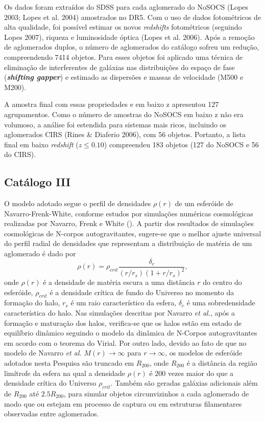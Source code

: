 Os dados foram extraídos do SDSS para cada aglomerado do NoSOCS (Lopes 2003; Lopes et al. 2004) amostrados no DR5. Com o uso de dados fotométricos de alta qualidade, foi possível estimar os novos \textit{redshifts} fotométricos (seguindo Lopes 2007), riqueza e luminosidade óptica (Lopes et al. 2006). Após a remoção de aglomerados duplos, o número de aglomerados do catálogo sofreu um redução, compreendendo 7414 objetos. Para esses objetos foi aplicado uma técnica de eliminação de interferentes de galáxias nas distribuições do espaço de fase (\textit{\textbf{shifting gapper}}) e estimado as dispersões e massas de velocidade (M500 e M200). 

A amostra final com essas propriedades e em baixo z apresentou 127 agrupamentos. Como o número de amostras do NoSOCS em baixo z não era volumoso, a análise foi estendida para sistemas mais ricos, incluindo os aglomerados CIRS (Rines \& Diaferio 2006), com 56 objetos. Portanto, a lista final em baixo \textit{redshift} ($z \leq 0.10$) compreendeu 183 objetos (127 do NoSOCS e 56 do CIRS). 

\subsection{Catálogo III}
O modelo adotado segue o perfil de densidades $\rho(r)$ de um esfer\'oide de Navarro-Frenk-White, conforme estudos por simula\c c\~oes num\'ericas cosmol\'ogicas realizadas por Navarro, Frenk e White (\cite{NFW1997}). A partir dos resultados de simula\c c\~oes cosmol\'ogicas de N-corpos autogravitantes, sugere-se que o melhor ajuste universal do perfil radial de densidades que representam a distribui\c c\~ao de mat\'eria de um aglomerado \'e dado por
\begin{equation}
\rho(r)=\rho_{crit}\frac{\delta_c}{(r/r_s)(1 + r/r_s)^2},
\label{nfw1}
\end{equation}
onde $\rho(r)$ \'e a densidade de mat\'eria escura a uma dist\^ancia $r$ do centro do esfer\'oide, $\rho_{crit}$ \'e a densidade cr\'itica de fundo do Universo no momento da forma\c c\~ao do halo, $r_s$ \'e um raio caracter\'istico da esfera, $\delta_c$ \'e uma sobredensidade caracter\'istica do halo. Nas simula\c c\~oes descritas por Navarro {\it et al.}, ap\'os a forma\c c\~ao e matura\c c\~ao dos halos, verifica-se que os halos est\~ao em estado de equil\'ibrio din\^amico seguindo o modelo da din\^amica de N-Corpos autogravitantes em acordo com o teorema do Virial. Por outro lado, devido ao fato de que no modelo de Navarro {\it et al.} $M(r) \to \infty$ para $r \to \infty$, os modelos de esfer\'oide adotados nesta Pesquisa s\~ao truncado em $R_{200}$, onde $R_{200}$ \'e a dist\^ancia da regi\~ao lim\'itrofe da esfera na qual a densidade $\rho(r)$ \'e 200 vezes maior do que a densidade cr\'itica do Universo $\rho_{crit}$. Tamb\'em s\~ao geradas gal\'axias adicionais al\'em de $R_{200}$ at\'e $2.5 R_{200}$, para simular objetos circunvizinhos a cada aglomerado de modo que ou estejam em processo de captura ou em estruturas filamentares observadas entre aglomerados.

